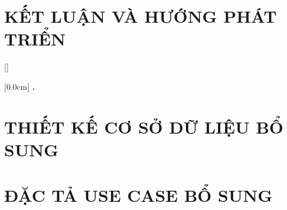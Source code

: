 \documentclass[a4paper,13pt,3p,twoside]{report}
\renewcommand{\bibname}{Danh_sach_tai_lieu_tham_khao}
\theoremstyle{definition}
\begin{document}
\chapter{KẾT LUẬN VÀ HƯỚNG PHÁT TRIỂN} %
\label{chapter:conclusion}


\newpage
\renewcommand\bibname{TÀI LIỆU THAM KHẢO}
\printbibliography
{}

\appendixpage
\appendices
\addappheadtotoc

[]
\titlespacing*{\chapter}{0pt}{-20pt}{20pt}

    [0.0cm]
    {\bfseries\vspace{0.3cm}}
    {{\bfseries{\scshape} \thecontentslabel.\ }}
    {}
    {\contentspage}
\chapter{THIẾT KẾ CƠ SỞ DỮ LIỆU BỔ SUNG}

\newpage
\chapter{ĐẶC TẢ USE CASE BỔ SUNG}

\end{document}
